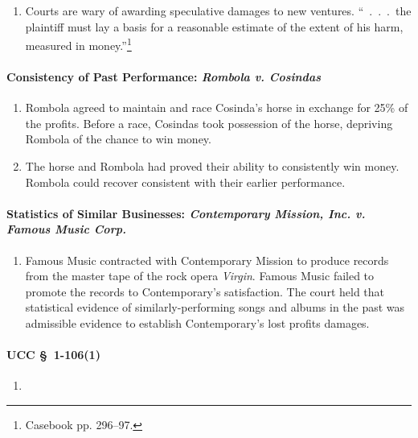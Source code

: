 \begin{enumerate}
    \item Courts are wary of awarding speculative damages to new ventures. 
    ``~.~.~.~the plaintiff must lay a basis for a reasonable estimate of the 
    extent of his harm, measured in money.''\footnote{Casebook pp. 296--97.}
\end{enumerate}

\paragraph{Consistency of Past Performance: \emph{Rombola v. Cosindas}}

\begin{enumerate}
    \item Rombola agreed to maintain and race Cosinda's horse in exchange for 
    25\% of the profits. Before a race, Cosindas took possession of the horse, 
    depriving Rombola of the chance to win money.
    \item The horse and Rombola had proved their ability to consistently win 
    money. Rombola could recover consistent with their earlier performance.
\end{enumerate}

\paragraph{Statistics of Similar Businesses: \emph{Contemporary Mission, Inc. 
v. Famous Music Corp.}}
\begin{enumerate}
    \item Famous Music contracted with Contemporary Mission to produce records 
    from the master tape of the rock opera \emph{Virgin}. Famous Music failed 
    to promote the records to Contemporary's satisfaction. The court held that 
    statistical evidence of similarly-performing songs and albums in the past 
    was admissible evidence to establish Contemporary's lost profits damages.
\end{enumerate}

\paragraph{UCC \S\ 1-106(1)}

\begin{enumerate}
    \item %
\end{enumerate}


